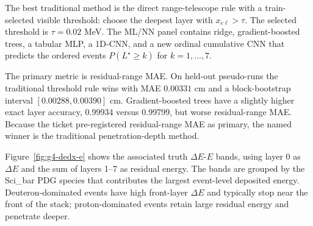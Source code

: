The best traditional method is the direct range-telescope rule with a
train-selected visible threshold: choose the deepest layer with
\(x_{e\ell}>\tau\). The selected threshold is \(\tau=0.02\) MeV. The ML/NN panel
contains ridge, gradient-boosted trees, a tabular MLP, a 1D-CNN, and a new
ordinal cumulative CNN that predicts the ordered events
\(P(L^\star\ge k)\) for \(k=1,\ldots,7\).

The primary metric is residual-range MAE. On held-out pseudo-runs the traditional
threshold rule wins with MAE \(0.00331\) cm and a block-bootstrap interval
\([0.00288,0.00390]\) cm. Gradient-boosted trees have a slightly higher exact
layer accuracy, 0.99934 versus 0.99799, but worse residual-range MAE. Because the
ticket pre-registered residual-range MAE as primary, the named winner is the
traditional penetration-depth method.

\begin{table}[H]
\centering
\caption{GEANT4 stopping-layer and residual-range benchmark on held-out
pseudo-runs. Lower residual MAE is the ranking metric.}
\label{tab:g4-range-benchmark}
\end{table}

Figure~\ref{fig:g4-dedx-e} shows the associated truth \(\Delta E\)-\(E\) bands,
using layer 0 as \(\Delta E\) and the sum of layers 1--7 as residual energy. The
bands are grouped by the Sci\_bar PDG species that contributes the largest
event-level deposited energy. Deuteron-dominated events have high front-layer
\(\Delta E\) and typically stop near the front of the stack; proton-dominated
events retain large residual energy and penetrate deeper.

